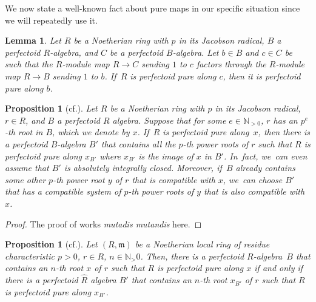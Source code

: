 \documentclass[11pt]{article}
\newcommand{\cf}{cf.\xspace}
\theoremstyle{plain}
\newtheorem{proposition}[theorem]{Proposition}
\newtheorem{lemma}[theorem]{Lemma}
\theoremstyle{definition}
\numberwithin{equation}{theorem}
\newcommand{\N}{\mathbb {N}}
\newcommand{\fram}{\mathfrak{m}}
\newcommand{\pe}{{p^e}}
\begin{document}
We now state a well-known fact about pure maps in our specific situation since we will repeatedly use it.

\begin{lemma}\label{pfd pure with smaller root}
Let $R$ be a Noetherian ring with $p$ in its Jacobson radical, $B$ a perfectoid $R$\nobreakdash-algebra, and $C$ be a perfectoid $B$-algebra. Let $b\in B$ and $c\in C$ be such that the $R$\nobreakdash-module map $R\to C$ sending $1$ to $c$ factors through the $R$\nobreakdash-module map $R\to B$ sending $1$ to $b$. If~$R$ is perfectoid pure along $c$, then it is perfectoid pure along $b$.
\end{lemma}

\begin{proposition}[\cf {\cite[Lem.\,4.5]{BMPSTWWPerfectoidPure}}]\label{pfd pure can be with alg closed alg}
Let $R$ be a Noetherian ring with $p$ in its Jacobson radical, $r\in R$, and $B$ a perfectoid $R$ algebra. Suppose that for some $e\in \N_{>0}$, $r$ has an $\pe$-th root in $B$, which we denote by $x$. If~$R$ is perfectoid pure along~$x$, then there is a perfectoid $B$-algebra $B'$ that contains all the $p$-th power roots of $r$ such that $R$ is perfectoid pure along $x_{B'}$ where $x_{B'}$ is the image of $x$ in $B'$. In~fact, we~can even assume that $B'$ is absolutely integrally closed. Moreover, if~$B$ already contains some other $p$-th power root $y$ of $r$ that is compatible with $x$, we~can choose $B'$ that has a compatible system of $p$-th power roots of $y$ that is also compatible with $x$.
\end{proposition}

\begin{proof}
The proof of \cite[Lem.\,4.5]{BMPSTWWPerfectoidPure} works \emph{mutadis mutandis} here.
\end{proof}

\begin{proposition}[{\cf \cite[Lem.\,4.8]{BMPSTWWPerfectoidPure}}]\label{pfd pure iff completion pfd pure}
Let $(R,\fram)$ be a Noetherian local ring of residue characteristic $p>0$, $r\in R$, $n\in \N_>0$. Then, there is a perfectoid $R$\nobreakdash-algebra~$B$ that contains an $n$-th root $x$ of $r$ such that $R$ is perfectoid pure along $x$ if and only if there is a perfectoid $\widehat{R}$ algebra $B'$ that contains an $n$-th root $x_{B'}$ of $r$ such that $R$ is perfectoid pure along $x_{B'}$.
\end{proposition}
\end{document}
